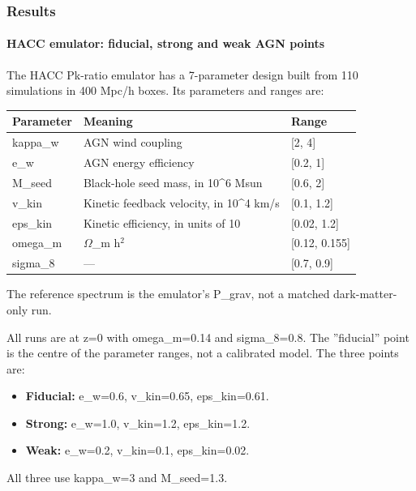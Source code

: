 \documentclass[11pt,a4paper]{article}
\begin{document}
\subsubsection*{Results}
\paragraph{HACC emulator: fiducial, strong and weak AGN points}
The HACC Pk-ratio emulator has a 7-parameter design built from 110 simulations in 400 Mpc/h boxes. Its parameters and ranges are:

\begin{longtable}{@{}p{}p{}p{}@{}}
\toprule
\textbf{Parameter} & \textbf{Meaning} & \textbf{Range} \\ \midrule \endhead
kappa\_w & AGN wind coupling & [2, 4] \\
e\_w & AGN energy efficiency & [0.2, 1] \\
M\_seed & Black-hole seed mass, in 10\textasciicircum{}6 Msun & [0.6, 2] \\
v\_kin & Kinetic feedback velocity, in 10\textasciicircum{}4 km/s & [0.1, 1.2] \\
eps\_kin & Kinetic efficiency, in units of 10 & [0.02, 1.2] \\
omega\_m & $\Omega$\_m h$^2$ & [0.12, 0.155] \\
sigma\_8 & --- & [0.7, 0.9] \\
\bottomrule\end{longtable}
The reference spectrum is the emulator's P\_grav, not a matched dark-matter-only run.

All runs are at z=0 with omega\_m=0.14 and sigma\_8=0.8. The ''fiducial'' point is the centre of the parameter ranges, not a calibrated model. The three points are:

\begin{itemize}
  \item \textbf{Fiducial:} e\_w=0.6, v\_kin=0.65, eps\_kin=0.61.
  \item \textbf{Strong:} e\_w=1.0, v\_kin=1.2, eps\_kin=1.2.
  \item \textbf{Weak:} e\_w=0.2, v\_kin=0.1, eps\_kin=0.02.
\end{itemize}
All three use kappa\_w=3 and M\_seed=1.3.
\end{document}
